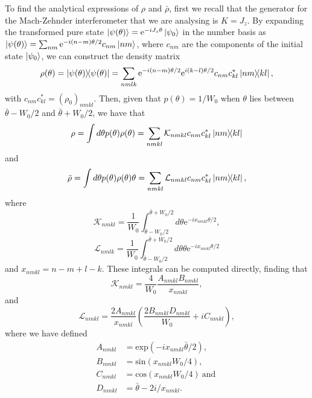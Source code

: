 To find the analytical expressions of $\rho$ and $\bar{\rho}$, first we recall that the generator for the Mach-Zehnder interferometer that we are analysing is $K = J_z$. By expanding the transformed pure state $\ket{\psi(\theta)} = \mathrm{e}^{-i J_z\theta}\ket{\psi_0}$ in the number basis as $\ket{\psi(\theta)} = \sum_{nm}\mathrm{e}^{-i (n-m)\theta/2}c_{nm}\ket{nm}$, where $c_{nm}$ are the components of the initial state $\ket{\psi_0}$, we can construct the density matrix
\begin{equation}
\rho(\theta) = \ketbra{\psi(\theta)} =\sum_{nmlk} \mathrm{e}^{-i (n-m)\theta/2} \mathrm{e}^{i (k-l)\theta/2} c_{nm}c^{*}_{kl}\ketbra{nm}{kl},
\end{equation}
with $c_{nm}c_{kl}^{*}=\left(\rho_{0}\right)_{nmkl}$. Then, given that $p(\theta)=1/W_0$ when $\theta$ lies between $\bar{\theta} - W_0/2$ and $\bar{\theta} + W_0/2$, we have that
\begin{equation}
\rho = \int d\theta p(\theta) \rho(\theta)= \sum_{nmkl} \mathcal{K}_{nmkl} c_{nm}c^{*}_{kl}\ketbra{nm}{kl}
\label{zeroth_qmoment_code}
\end{equation}
and
\begin{equation}
\bar{\rho} = \int d\theta p(\theta)\rho(\theta) \theta = \sum_{nmkl} \mathcal{L}_{nmkl} c_{nm}c^{*}_{kl}\ketbra{nm}{kl},
\label{first_qmoment_code}
\end{equation}
where
\begin{equation}
\mathcal{K}_{nmkl} = \frac{1}{W_0}\int_{\bar{\theta}-W_0/2}^{\bar{\theta}+W_0/2}d\theta \mathrm{e}^{-ix_{nmkl}\theta/2},
\label{k_semianalytical_int}
\end{equation}
\begin{equation}
\mathcal{L}_{nmlk} = \frac{1}{W_0}\int_{\bar{\theta}-W_0/2}^{\bar{\theta}+W_0/2} d\theta \theta \mathrm{e}^{-ix_{nmkl}\theta/2}
\end{equation}
and $x_{nmkl}=n-m+l-k$. These integrals can be computed directly, finding that
\begin{equation}
\mathcal{K}_{nmkl} = \frac{4}{W_0}\frac{A_{nmkl} B_{nmkl}}{x_{nmkl}},
\label{k_semianalytical_sol}
\end{equation}
and
\begin{equation}
\mathcal{L}_{nmkl} = \frac{2 A_{nmkl}}{x_{nmkl}} \left(\frac{2 B_{nmkl} D_{nmkl}}{W_0} + iC_{nmkl}\right),
\end{equation}
where we have defined
\begin{align}
A_{nmkl}&=\mathrm{exp}\left(-i x_{nmkl}\bar{\theta}/2\right),
\nonumber \\
B_{nmkl}&=\mathrm{sin}\left(x_{nmkl}W_0/4\right),
\nonumber \\
C_{nmkl}&=\mathrm{cos}\left(x_{nmkl}W_0/4\right)~\mathrm{and}~
\nonumber \\
D_{nmkl}&=\bar{\theta}-2 i/x_{nmkl}.
\label{d_semianalytical_auxiliar}
\end{align}
